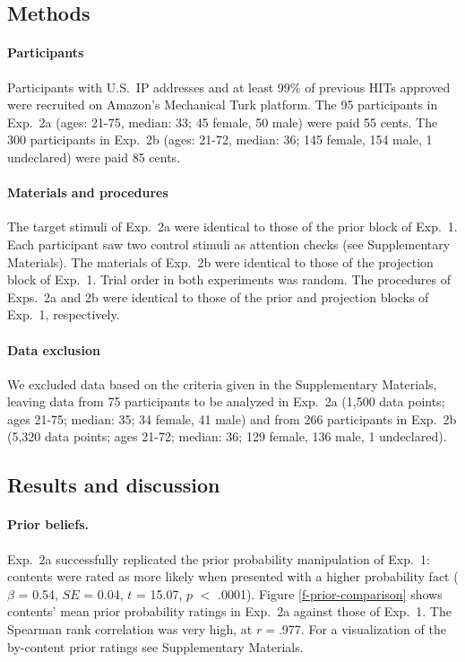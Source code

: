 \documentclass[OpenMind]{stjour}
\begin{document}
\subsection{Methods}


\paragraph{Participants} Participants with U.S.\ IP addresses and at least 99\% of previous HITs approved were recruited on Amazon's Mechanical Turk platform. The 95 participants in Exp.~2a (ages: 21-75, median: 33; 45 female, 50 male) were paid 55 cents. The 300 participants in Exp.~2b (ages: 21-72, median: 36; 145 female, 154 male, 1 undeclared) were paid 85 cents.

\paragraph{Materials and procedures} The target stimuli of Exp.~2a were identical to those of the prior block of Exp.~1. Each participant saw two control stimuli as attention checks (see Supplementary Materials). The materials of Exp.~2b were identical to those of the projection block of Exp.~1. Trial order in both experiments was random. The procedures of Exps.~2a and 2b were identical to those of the prior and projection blocks of Exp.~1, respectively.

\paragraph{Data exclusion} We excluded data based on the criteria given in the Supplementary Materials, leaving data from 75 participants to be analyzed in Exp.~2a (1,500 data points; ages 21-75; median: 35; 34 female, 41 male) and from 266 participants in Exp.~2b (5,320 data points; ages 21-72; median: 36; 129 female, 136 male, 1 undeclared).

\subsection{Results and discussion}

\paragraph{Prior beliefs.} Exp.~2a successfully replicated the prior probability manipulation of Exp.~1: contents were rated as more likely when presented with a higher probability fact ($\beta$ = 0.54, $SE$ = 0.04, $t$ = 15.07, $p$ $<$ .0001).  Figure \ref{f-prior-comparison} shows contents' mean prior probability ratings in Exp.~2a against those of Exp.~1. The Spearman rank correlation was very high, at $r=$.977. For a visualization of the by-content prior ratings see Supplementary Materials.
\end{document}

